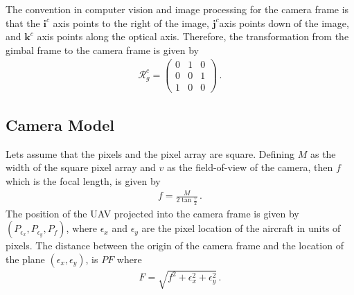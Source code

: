 The convention in computer vision and image processing for the camera frame is that the $\boldsymbol{i}^c$ axis points to the right of the image, $\boldsymbol{j}^c$axis points down of the image, and $\boldsymbol{k}^c$ axis points along the optical axis. Therefore, the transformation from the gimbal frame to the camera frame is given by
\begin{align}
\mathcal{R}^c_{g}=
\begin{pmatrix}
0 & 1 & 0 \\
0 & 0 & 1 \\
1 & 0 & 0
\end{pmatrix}\,.
\end{align}

\subsection{Camera Model}{\label{sub:camera_model}}
Lets assume that the pixels and the pixel array are square. Defining $M$ as the width of the square pixel array and $v$ as the field-of-view of the camera, then $f$ which is the focal length, is given by
\begin{align}
f=\frac{M}{2\tan\frac{v}{2}}\,.
\end{align}
The position of the UAV projected into the camera frame is given by $(P_{\epsilon_x},P_{\epsilon_y},P_f)$, where $\epsilon_x$ and $\epsilon_y$ are the pixel location of the aircraft in units of pixels. The distance between the origin of the camera frame and the location of the plane $(\epsilon_x,\epsilon_y)$, is $PF$ where
\begin{align}
F=\sqrt{f^2+\epsilon_x^2+\epsilon_y^2}\,.
\end{align}

